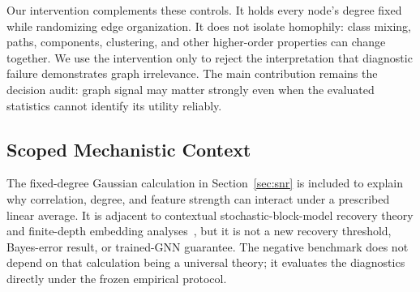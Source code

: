 Our intervention complements these controls. It holds every node's degree fixed while randomizing edge organization. It does not isolate homophily: class mixing, paths, components, clustering, and other higher-order properties can change together. We use the intervention only to reject the interpretation that diagnostic failure demonstrates graph irrelevance. The main contribution remains the decision audit: graph signal may matter strongly even when the evaluated statistics cannot identify its utility reliably.

\subsection{Scoped Mechanistic Context}

The fixed-degree Gaussian calculation in Section~\ref{sec:snr} is included to explain why correlation, degree, and feature strength can interact under a prescribed linear average. It is adjacent to contextual stochastic-block-model recovery theory and finite-depth embedding analyses~\cite{lu2023contextual,pmlr-v269-dalle25a}, but it is not a new recovery threshold, Bayes-error result, or trained-GNN guarantee. The negative benchmark does not depend on that calculation being a universal theory; it evaluates the diagnostics directly under the frozen empirical protocol.
